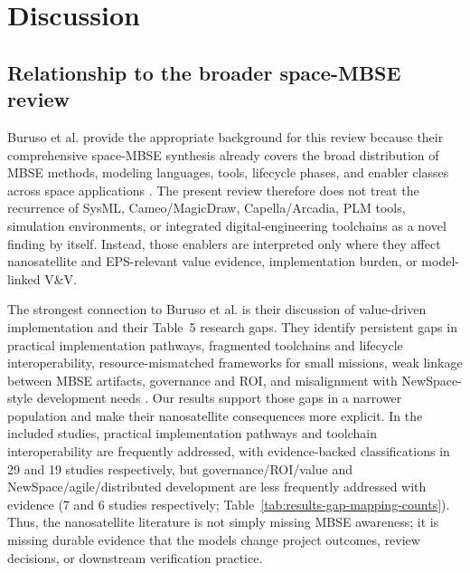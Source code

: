 \section{Discussion}
\label{sec:discussion}

\subsection{Relationship to the broader space-MBSE review}
\label{sec:discussion-buruso-relationship}

Buruso et al. provide the appropriate background for this review because their comprehensive space-MBSE synthesis already covers the broad distribution of MBSE methods, modeling languages, tools, lifecycle phases, and enabler classes across space applications \cite{Buruso2026MBSESpace}.  The present review therefore does not treat the recurrence of SysML, Cameo/MagicDraw, Capella/Arcadia, PLM tools, simulation environments, or integrated digital-engineering toolchains as a novel finding by itself.  Instead, those enablers are interpreted only where they affect nanosatellite and EPS-relevant value evidence, implementation burden, or model-linked V\&V.

The strongest connection to Buruso et al. is their discussion of value-driven implementation and their Table~5 research gaps.  They identify persistent gaps in practical implementation pathways, fragmented toolchains and lifecycle interoperability, resource-mismatched frameworks for small missions, weak linkage between MBSE artifacts, governance and ROI, and misalignment with NewSpace-style development needs \cite{Buruso2026MBSESpace}.  Our results support those gaps in a narrower population and make their nanosatellite consequences more explicit.  In the included studies, practical implementation pathways and toolchain interoperability are frequently addressed, with evidence-backed classifications in 29 and 19 studies respectively, but governance/ROI/value and NewSpace/agile/distributed development are less frequently addressed with evidence (7 and 6 studies respectively; Table~\ref{tab:results-gap-mapping-counts}).  Thus, the nanosatellite literature is not simply missing MBSE awareness; it is missing durable evidence that the models change project outcomes, review decisions, or downstream verification practice.

